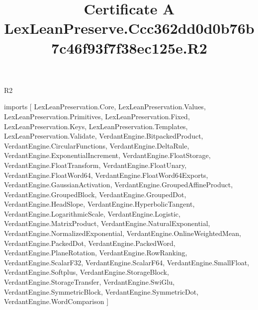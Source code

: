 \begin{lexlean}{R2}
\title{Certificate A LexLeanPreserve.Ccc362dd0d0b76b7c46f93f7f38ec125e.R2}
\begin{coremodule}
imports [
  LexLeanPreservation.Core,
  LexLeanPreservation.Values,
  LexLeanPreservation.Primitives,
  LexLeanPreservation.Fixed,
  LexLeanPreservation.Keys,
  LexLeanPreservation.Templates,
  LexLeanPreservation.Validate,
  VerdantEngine.BitpackedProduct,
  VerdantEngine.CircularFunctions,
  VerdantEngine.DeltaRule,
  VerdantEngine.ExponentialIncrement,
  VerdantEngine.FloatStorage,
  VerdantEngine.FloatTransform,
  VerdantEngine.FloatUnary,
  VerdantEngine.FloatWord64,
  VerdantEngine.FloatWord64Exports,
  VerdantEngine.GaussianActivation,
  VerdantEngine.GroupedAffineProduct,
  VerdantEngine.GroupedBlock,
  VerdantEngine.GroupedDot,
  VerdantEngine.HeadSlope,
  VerdantEngine.HyperbolicTangent,
  VerdantEngine.LogarithmicScale,
  VerdantEngine.Logistic,
  VerdantEngine.MatrixProduct,
  VerdantEngine.NaturalExponential,
  VerdantEngine.NormalizedExponential,
  VerdantEngine.OnlineWeightedMean,
  VerdantEngine.PackedDot,
  VerdantEngine.PackedWord,
  VerdantEngine.PlaneRotation,
  VerdantEngine.RowRanking,
  VerdantEngine.ScalarF32,
  VerdantEngine.ScalarF64,
  VerdantEngine.SmallFloat,
  VerdantEngine.Softplus,
  VerdantEngine.StorageBlock,
  VerdantEngine.StorageTransfer,
  VerdantEngine.SwiGlu,
  VerdantEngine.SymmetricBlock,
  VerdantEngine.SymmetricDot,
  VerdantEngine.WordComparison
]


\end{coremodule}
\end{lexlean}
